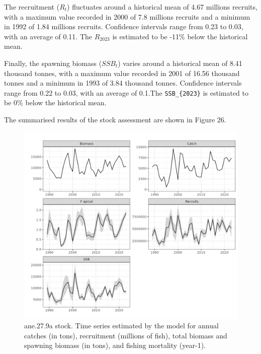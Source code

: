 \documentclass[
]{article}
\begin{document}
The recruitment (\(R_t\)) fluctuates around a historical mean of 4.67
millions recruits, with a maximum value recorded in 2000 of 7.8 millions
recruits and a minimum in 1992 of 1.84 millions recruits. Confidence
intervals range from 0.23 to 0.03, with an average of 0.11. The
\(R_{2023}\) is estimated to be -11\% below the historical mean.

Finally, the spawning biomass (\(SSB_{t}\)) varies around a historical
mean of 8.41 thousand tonnes, with a maximum value recorded in 2001 of
16.56 thousand tonnes and a minimum in 1993 of 3.84 thousand tonnes.
Confidence intervals range from 0.22 to 0.03, with an average of 0.1.The
\texttt{SSB\_\{2023\}} is estimated to be 0\% below the historical mean.

The summarised results of the stock assessment are shown in Figure 26.

\begin{figure}[H]

{\centering \includegraphics[width=0.95\linewidth]{report/run/S1.0_4FLEETS/fig_time_series} 

}

\caption{ane.27.9a stock. Time series estimated by the model for annual catches (in tons), recruitment (millions of fish), total biomass and spawning biomass (in tons), and fishing mortality (year-1).}\label{fig:unnamed-chunk-34}
\end{figure}
\end{document}

